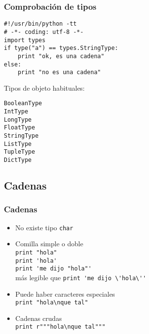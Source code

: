 \documentclass[ucs]{beamer}
\begin{document}
\begin{frame}[fragile]
\frametitle{Comprobación de tipos}

  \begin{scriptsize}
  \begin{verbatim}
#!/usr/bin/python -tt
# -*- coding: utf-8 -*-
import types
if type("a") == types.StringType:
    print "ok, es una cadena"
else:
    print "no es una cadena"
  \end{verbatim}
  \end{scriptsize}

Tipos de objeto habituales:

  \begin{scriptsize}
  \begin{verbatim}
BooleanType
IntType
LongType
FloatType
StringType
ListType
TupleType
DictType
  \end{verbatim}
  \end{scriptsize}

\end{frame}



\subsection{Cadenas}

\begin{frame}[fragile]
\frametitle{Cadenas }

\begin{itemize}
\item No existe tipo \verb|char|
\item 
Comilla simple o doble \\
\verb|print "hola"|   \\
\verb|print 'hola'|  \\
\verb|print 'me dijo "hola"'|    \\   
más legible que
\verb|print 'me dijo \'hola\''|    
\item 
Puede haber caracteres especiales\\
\verb|print "hola\nque tal"|   
\item 
Cadenas crudas\\
\verb|print r"""hola\nque tal"""|   

\end{itemize}
\end{frame}
\end{document}
